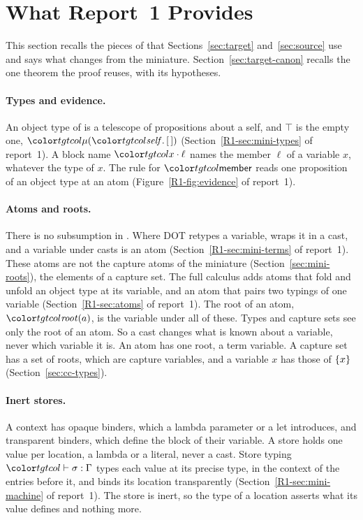 \section{What Report~1 Provides}\label{sec:recap}
\mathtgt

This section recalls the pieces of \Rone that Sections~\ref{sec:target} and~\ref{sec:source} use and says what changes from the miniature. Section~\ref{sec:target-canon} recalls the one theorem the proof reuses, with its hypotheses.

\paragraph{Types and evidence.}
An object type of \FCdot is a telescope of propositions about a self, and $\top$ is the empty one, $\obj{\tnil}$ (Section~\ref{R1-sec:mini-types} of report~1). A block name $\sel{x}{\ell}$ names the member $\ell$ of a variable $x$, whatever the type of $x$. The rule for $\ev{member}$ reads one proposition of an object type at an atom (Figure~\ref{R1-fig:evidence} of report~1).

\paragraph{Atoms and roots.}
There is no subsumption in \FCdot. Where DOT retypes a variable, \FCdot wraps it in a cast, and a variable under casts is an atom (Section~\ref{R1-sec:mini-terms} of report~1). These atoms are not the capture atoms of the miniature (Section~\ref{sec:mini-roots}), the elements of a capture set. The full calculus adds atoms that fold and unfold an object type at its variable, and an atom that pairs two typings of one variable (Section~\ref{R1-sec:atoms} of report~1). The root of an atom, $\rt{a}$, is the variable under all of these. Types and capture sets see only the root of an atom. So a cast changes what is known about a variable, never which variable it is. An atom has one root, a term variable. A capture set has a set of roots, which are capture variables, and a variable $x$ has those of $\{x\}$ (Section~\ref{sec:cc-types}).

\paragraph{Inert stores.}
A context has opaque binders, which a lambda parameter or a let introduces, and transparent binders, which define the block of their variable. A store holds one value per location, a lambda or a literal, never a cast. Store typing $\storej{\sigma}{\Gamma}$ types each value at its precise type, in the context of the entries before it, and binds its location transparently (Section~\ref{R1-sec:mini-machine} of report~1). The store is inert, so the type of a location asserts what its value defines and nothing more.

